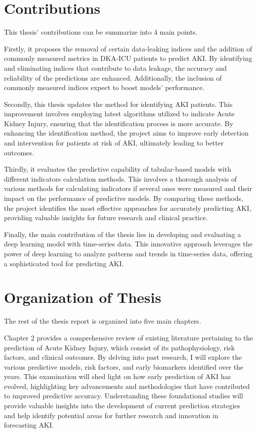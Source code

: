 \documentclass[../main.tex]{subfiles}
\begin{document}
\section{Contributions}

This thesis' contributions can be summarize into 4 main points.

Firstly, it proposes the removal of certain data-leaking indices and the addition of commonly measured metrics in DKA-ICU patients to predict AKI. 
By identifying and eliminating indices that contribute to data leakage, the accuracy and reliability of the predictions are enhanced. 
Additionally, the inclusion of commonly measured indices expect to boost models' performance.

Secondly, this thesis updates the method for identifying AKI patients. This improvement involves employing latest algorithms utilized to indicate Acute Kidney Injury, ensuring that the identification process is more accurate.
By enhancing the identification method, the project aims to improve early detection and intervention for patients at risk of AKI, ultimately leading to better outcomes.

Thirdly, it evaluates the predictive capability of tabular-based models with different indicators calculation methods. 
This involves a thorough analysis of various methods for calculating indicators if several ones were measured and their impact on the performance of predictive models. 
By comparing these methods, the project identifies the most effective approaches for accurately predicting AKI, providing valuable insights for future research and clinical practice.

Finally, the main contribution of the thesis lies in developing and evaluating a deep learning model with time-series data.
This innovative approach leverages the power of deep learning to analyze patterns and trends in time-series data, offering a sophisticated tool for predicting AKI.

\section{Organization of Thesis}
The rest of the thesis report is organized into five main chapters.

Chapter 2 provides a comprehensive review of existing literature pertaining to the prediction of Acute Kidney Injury,  which consist of its pathophysiology, risk factors, and clinical outcomes.
By delving into past research, I will explore the various predictive models, risk factors, and early biomarkers identified over the years.
This examination will shed light on how early prediction of AKI has evolved, highlighting key advancements and methodologies that have contributed to improved predictive accuracy.
Understanding these foundational studies will provide valuable insights into the development of current prediction strategies and help identify potential areas for further research and innovation in forecasting AKI.
\end{document}

